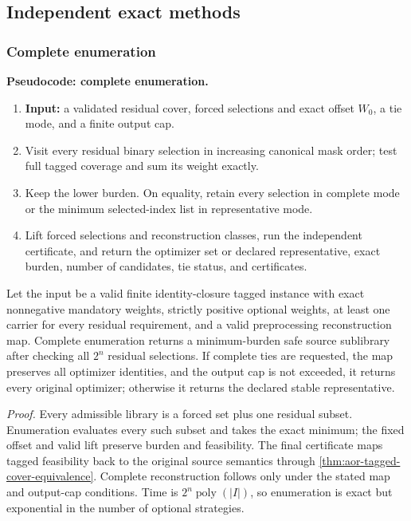 \AORAlgorithmGuaranteeTable

\subsection{Independent exact methods}
\label{subsec:aor-exact-algorithms}

\subsubsection{Complete enumeration}

\noindent\textbf{Pseudocode: complete enumeration.}
\begin{enumerate}
 \item \textbf{Input:} a validated residual cover, forced selections and
       exact offset \(W_0\), a tie mode, and a finite output cap.
 \item Visit every residual binary selection in increasing canonical mask
       order; test full tagged coverage and sum its weight exactly.
 \item Keep the lower burden.  On equality, retain every selection in complete
       mode or the minimum selected-index list in representative mode.
 \item Lift forced selections and reconstruction classes, run the independent
       certificate, and return the optimizer set or declared representative,
       exact burden, number of candidates, tie status, and certificates.
\end{enumerate}

\begin{proposition}
\label{prop:aor-complete-enumeration}
Let the input be a valid finite identity-closure tagged instance with exact
nonnegative mandatory weights, strictly positive optional weights, at least one
carrier for every residual requirement, and a valid preprocessing
reconstruction map.  Complete enumeration returns a minimum-burden safe source
sublibrary after checking all \(2^n\) residual selections.  If complete ties
are requested, the map preserves all optimizer identities, and the output cap
is not exceeded, it returns every original optimizer; otherwise it returns the
declared stable representative.
\end{proposition}

\noindent\emph{Proof.}
Every admissible library is a forced set plus one residual subset.
Enumeration evaluates every such subset and takes the exact minimum; the fixed
offset and valid lift preserve burden and feasibility.  The final certificate
maps tagged feasibility back to the original source semantics through
\cref{thm:aor-tagged-cover-equivalence}.  Complete reconstruction follows only
under the stated map and output-cap conditions.  Time is
\(2^n\operatorname{poly}(|I|)\), so enumeration is exact but exponential in
the number of optional strategies.

